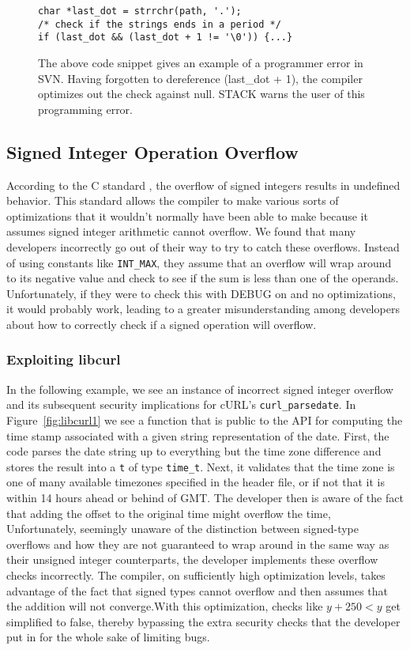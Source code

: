 \documentclass[10pt,twocolumn]{article}
\begin{document}
\begin{figure}
\begin{lstlisting}
char *last_dot = strrchr(path, '.');
/* check if the strings ends in a period */
if (last_dot && (last_dot + 1 != '\0')) {...}
\end{lstlisting}
\caption{\label{fig:svn} The above code snippet gives an example of a programmer error
in SVN. Having forgotten to dereference (last\_dot + 1), the compiler optimizes out the check
against null. STACK warns the user of this programming error.}
\end{figure}

\subsection{Signed Integer Operation Overflow}
According to the C standard \cite{c11}, the overflow of signed integers results
in undefined behavior. This standard allows the compiler to make various sorts
of optimizations that it wouldn't normally have been able to make because it
assumes signed integer arithmetic cannot overflow. We found that many
developers incorrectly go out of their way to try to catch these overflows.
Instead of using constants like \texttt{INT\_MAX}, they assume that an overflow
will wrap around to its negative value and check to see if the sum is less than
one of the operands. Unfortunately, if they were to check this with DEBUG on
and no optimizations, it would probably work, leading to a greater
misunderstanding among developers about how to correctly check if a signed
operation will overflow.

\subsubsection{Exploiting libcurl}
In the following example, we see an instance of incorrect signed integer
overflow and its subsequent security implications for cURL's
\texttt{curl\_parsedate}. In Figure~\ref{fig:libcurl1} we see a function that
is public to the API for computing the time stamp associated with a given
string representation of the date. First, the code parses the date string up to
everything but the time zone difference and stores the result into a \texttt{t}
of type \texttt{time\_t}. Next, it validates that the time zone is one of many
available timezones specified in the header file, or if not that it is within
14 hours ahead or behind of GMT. The developer then is aware of the fact that
adding the offset to the original time might overflow the time, Unfortunately,
seemingly unaware of the distinction between signed-type overflows and how they
are not guaranteed to wrap around in the same way as their unsigned integer
counterparts, the developer implements these overflow checks incorrectly. The
compiler, on sufficiently high optimization levels, takes advantage of the fact
that signed types cannot overflow and then assumes that the addition will not
converge.With this optimization, checks like $y + 250 < y$ get simplified to
false, thereby bypassing the extra security checks that the developer put in
for the whole sake of limiting bugs.
\end{document}
